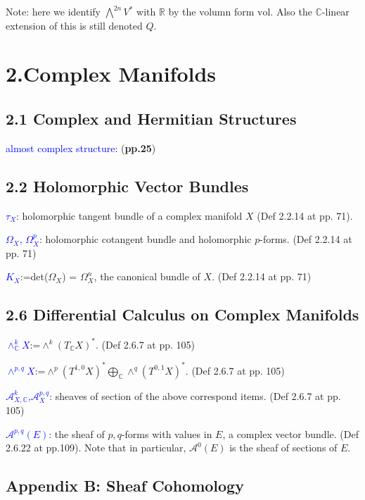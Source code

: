     Note: here we identify $\bigwedge^{2n}V^*$ with $\mathbb{R}$ 
    by the volumn form $\text{vol}$. Also the $\mathbb{C}$-linear 
    extension of this is still denoted $Q$.

\section{2.Complex Manifolds}

    \subsection{2.1 Complex and Hermitian Structures}
    \textcolor{blue}{almost complex structure}: (\textbf{pp.25})
	\subsection{2.2 Holomorphic Vector Bundles}

    \textcolor{blue}{$\tau_X$}: holomorphic tangent bundle of a complex manifold $X$ (Def 2.2.14 at pp. 71).
    
    \textcolor{blue}{$\varOmega_X$, $\varOmega^p_X$}: holomorphic cotangent bundle and holomorphic $p$-forms. (Def 2.2.14 at pp. 71)
    
    \textcolor{blue}{$K_X$}:=det($\varOmega_X$) = $\varOmega_X^n$, the canonical bundle of $X$. (Def 2.2.14 at pp. 71)

    \subsection{2.6 Differential Calculus on Complex Manifolds}

    \textcolor{blue}{$\wedge^k_{\mathbb{C}}X$}:=$\wedge^k(T_{\mathbb{C}}X)^*$. (Def 2.6.7 at pp. 105)
    
    \textcolor{blue}{$\wedge^{p,q}X$}:=$\wedge^p(T^{1,0}X)^*
                        \bigoplus_{\mathbb{C}}\wedge^q(T^{0,1}X)^*$. (Def 2.6.7 at pp. 105)

    \textcolor{blue}{$\mathcal{A}^k_{X,\mathbb{C}}$,$\mathcal{A}^{p,q}_X$}: sheaves of section of the above correspond items. (Def 2.6.7 at pp. 105)
    
    \textcolor{blue}{$\mathcal{A}^{p,q}(E)$}: the sheaf of $p,q$-forms with values in $E$, a complex vector bundle. (Def 2.6.22 at pp.109). Note that in particular, $\mathcal{A}^0(E)$ is the sheaf of sections of $E$.

	\subsection{Appendix B: Sheaf Cohomology}
	
